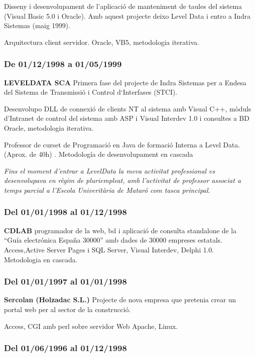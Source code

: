 \documentclass[11pt]{article}
\begin{document}
Disseny i desenvolupament de l’aplicació de manteniment de taules del sistema (Visual Basic 5.0 i Oracle). Amb aquest projecte deixo Level Data i entro a Indra Sistemas (maig 1999).

Arquitectura client servidor. Oracle, VB5, metodologia iterativa.
\subsubsection{De 01/12/1998 a 01/05/1999}
\label{sec-5-2-2}

\textbf{LEVELDATA SCA}
Primera fase del projecte de Indra Sistemas per a Endesa del Sistema de Transmissió i Control d‘Interfases (STCI).

Desenvolupo DLL de connexió de clients NT al sistema amb Visual C++, mòduls d’Intranet de control del sistema amb ASP i Visual Interdev 1.0 i consultes a BD Oracle, metodologia iterativa.

Professor de curset de Programació en Java de formació Interna a Level Data. (Aprox. de 40h) . Metodología de desenvolupament en cascada

\emph{Fins el moment d’entrar a LevelData la meva activitat professional es desenvolupava en règim de pluriempleat, amb l’activitat de professor associat a temps parcial a l’Escola Univeritària de Mataró com tasca principal}.
\subsubsection{Del 01/01/1998 al 01/12/1998}
\label{sec-5-2-3}

\textbf{CDLAB}
programador de la web, bd i aplicació de consulta standalone de la ``Guía electrónica España 30000'' amb dades de 30000 empreses estatals. Access,Active Server Pages i SQL Server, Visual Interdev, Delphi 1.0. Metodologia en cascada.
\subsubsection{Del 01/01/1997 al 01/01/1998}
\label{sec-5-2-4}

\textbf{Sercolan (Holzadac S.L.)}
Projecte de nova empresa que pretenia crear un portal web per al sector de la construcció. 

Access, CGI amb perl sobre servidor Web Apache, Linux.
\subsubsection{Del 01/06/1996 al 01/12/1998}
\label{sec-5-2-5}
\end{document}
